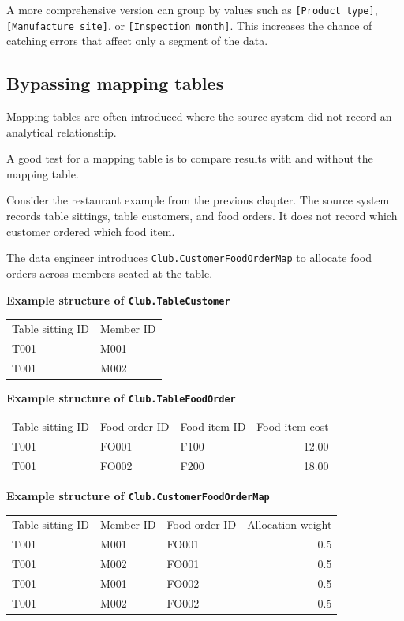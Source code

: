 \documentclass[10pt,openany,10pt]{book}
\newcounter{none}
\let\podeToprule\toprule
\let\podeMidrule\midrule
\let\podeBottomrule\bottomrule
\renewcommand{\toprule}{\arrayrulecolor{pbiGrid}\podeToprule}
\renewcommand{\midrule}{\arrayrulecolor{pbiGrid}\podeMidrule}
\renewcommand{\bottomrule}{\arrayrulecolor{pbiGrid}\podeBottomrule}
\begin{document}
A more comprehensive version can group by values such as
\texttt{{[}Product\ type{]}}, \texttt{{[}Manufacture\ site{]}}, or
\texttt{{[}Inspection\ month{]}}. This increases the chance of catching
errors that affect only a segment of the data.

\subsection{Bypassing mapping tables}\label{bypassing-mapping-tables}

Mapping tables are often introduced where the source system did not
record an analytical relationship.

A good test for a mapping table is to compare results with and without
the mapping table.

Consider the restaurant example from the previous chapter. The source
system records table sittings, table customers, and food orders. It does
not record which customer ordered which food item.

The data engineer introduces \texttt{Club.CustomerFoodOrderMap} to
allocate food orders across members seated at the table.

\textbf{Example structure of \texttt{Club.TableCustomer}}

{\def\LTcaptype{none} %
\begin{longtable}[]{@{}ll@{}}
\toprule\noalign{}
Table sitting ID & Member ID \\
\midrule\noalign{}
\endhead
\bottomrule\noalign{}
\endlastfoot
T001 & M001 \\
T001 & M002 \\
\end{longtable}
}

\textbf{Example structure of \texttt{Club.TableFoodOrder}}

{\def\LTcaptype{none} %
\begin{longtable}[]{@{}lllr@{}}
\toprule\noalign{}
Table sitting ID & Food order ID & Food item ID & Food item cost \\
\midrule\noalign{}
\endhead
\bottomrule\noalign{}
\endlastfoot
T001 & FO001 & F100 & 12.00 \\
T001 & FO002 & F200 & 18.00 \\
\end{longtable}
}

\textbf{Example structure of \texttt{Club.CustomerFoodOrderMap}}

{\def\LTcaptype{none} %
\begin{longtable}[]{@{}lllr@{}}
\toprule\noalign{}
Table sitting ID & Member ID & Food order ID & Allocation weight \\
\midrule\noalign{}
\endhead
\bottomrule\noalign{}
\endlastfoot
T001 & M001 & FO001 & 0.5 \\
T001 & M002 & FO001 & 0.5 \\
T001 & M001 & FO002 & 0.5 \\
T001 & M002 & FO002 & 0.5 \\
\end{longtable}
}
\end{document}
